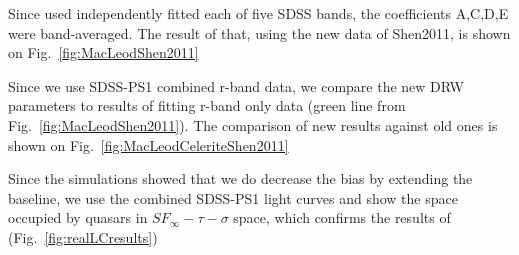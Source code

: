 \documentclass[twocolumn]{aastex62}
\begin{document}
Since  \citet{macleod2011} used independently fitted each of five SDSS bands, the coefficients A,C,D,E were band-averaged. The result of that, using the new data of Shen2011, is shown on Fig.~\ref{fig:MacLeodShen2011}



\begin{figure*}
\caption{Samples from posterior MCMC draws for fit coefficients A,C,D (setting E=0), using Shen2011 values for redshift, absolute i-band magnitide, black hole mass. The vertical dashed line marks the band-averaged values for fit coefficients.  }
\label{fig:MacLeodShen2011}
\end{figure*} 



Since we use SDSS-PS1 combined r-band data, we compare the new DRW parameters to results of fitting \citet{macleod2011}  r-band only data (green line from Fig.~\ref{fig:MacLeodShen2011}). The comparison of new results against old ones is shown on Fig.~\ref{fig:MacLeodCeleriteShen2011}



\begin{figure*}
\caption{Comparison of Celerite fits of SDSS, SDSS-PS1 portions of combined quasar light curves against \citet{macleod2011} results of SDSS r-band only. The results from SDSS-only portion are consistent with previous results, and inclusion of the PS1 portion that increases the baseline decreases the timescale dependence on black hole mass, but increases the luminosity dependence. This can be understood as a rotation of the plane in ($\tau$, $M_{i}$, $M_{BH}$) coordinates.  }
\label{fig:MacLeodCeleriteShen2011}
\end{figure*} 


Since the simulations showed that we do decrease the bias by extending the  baseline, we use the combined SDSS-PS1  light curves and show the space occupied by quasars in $SF_{\infty} - \tau - \sigma$ space, which confirms the results of \citet{macleod2011} (Fig.~\ref{fig:realLCresults})




\begin{figure*}
\caption{Both relations are shown in the observed frame. The left panel is like Fig.6, and the right like Fig.14 in \citet{macleod2011}. }
\label{fig:realLCresults}
\end{figure*} 







 


\end{document}
